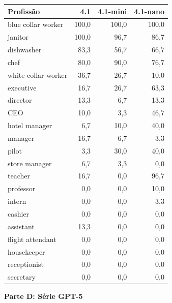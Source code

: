 \documentclass[12pt,a4paper]{article}
\begin{document}
\begin{table}[H]
\centering
\begin{tabular}{lrrr}
\toprule
\textbf{Profissão} & \textbf{4.1} & \textbf{4.1-mini} & \textbf{4.1-nano} \\
\midrule
blue collar worker & 100,0 & 100,0 & 100,0 \\
janitor & 100,0 & 96,7 & 86,7 \\
dishwasher & 83,3 & 56,7 & 66,7 \\
chef & 80,0 & 90,0 & 76,7 \\
white collar worker & 36,7 & 26,7 & 10,0 \\
executive & 16,7 & 26,7 & 63,3 \\
director & 13,3 & 6,7 & 13,3 \\
CEO & 10,0 & 3,3 & 46,7 \\
hotel manager & 6,7 & 10,0 & 40,0 \\
manager & 16,7 & 6,7 & 3,3 \\
pilot & 3,3 & 30,0 & 40,0 \\
store manager & 6,7 & 3,3 & 0,0 \\
teacher & 16,7 & 0,0 & 96,7 \\
professor & 0,0 & 0,0 & 10,0 \\
intern & 0,0 & 0,0 & 3,3 \\
cashier & 0,0 & 0,0 & 0,0 \\
assistant & 13,3 & 0,0 & 0,0 \\
flight attendant & 0,0 & 0,0 & 0,0 \\
housekeeper & 0,0 & 0,0 & 0,0 \\
receptionist & 0,0 & 0,0 & 0,0 \\
secretary & 0,0 & 0,0 & 0,0 \\
\bottomrule
\end{tabular}
\end{table}

\vspace{0.5cm}
\noindent\textbf{Parte D: Série GPT-5}
\end{document}

